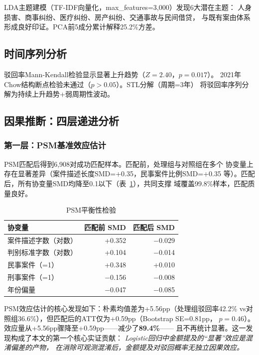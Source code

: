 \documentclass[12pt,a4paper,twoside]{ctexart}
\newcommand{\tabref}[1]{表~\ref{tab:#1}}
\begin{document}
LDA主题建模（TF-IDF向量化，max\_features=3,000）发现6大潜在主题：
人身损害、商事纠纷、医疗纠纷、房产纠纷、交通事故与民间借贷，
与既有案由体系形成良好印证。PCA前5成分累计解释25.2\%方差。

\subsection{时间序列分析}

驳回率Mann-Kendall检验显示显著上升趋势（$Z=2.40$，$p=0.017$）。
2021年Chow结构断点检验未通过（$p>0.05$）。STL分解（周期=3年）
将驳回率序列分解为持续上升趋势+弱周期性波动。

\subsection{因果推断：四层递进分析}

\subsubsection{第一层：PSM基准效应估计}

PSM匹配后得到6,908对成功匹配样本。匹配前，处理组与对照组在多个
协变量上存在显著差异（案件描述长度SMD=+0.35，民事案件比例SMD=+0.35
等）。匹配后，所有协变量SMD均降至0.1以下（\tabref{psm}），共同支撑
域覆盖99.8\%样本，匹配质量良好。

\begin{table}[H]\centering\caption{PSM平衡性检验}
\label{tab:psm}
\begin{tabular}{@{}lrr@{}}
\toprule
\textbf{协变量} & \textbf{匹配前 SMD} & \textbf{匹配后 SMD} \\
\midrule
案件描述字数（对数） & +0.352 & $-$0.029 \\
判别标准字数（对数） & +0.104 & $-$0.014 \\
民事案件（=1）      & +0.348 & +0.010 \\
刑事案件（=1）      & $-$0.156 & $-$0.008 \\
年份偏量            & $-$0.047 & $-$0.085 \\
\bottomrule
\end{tabular}
\end{table}

PSM效应估计的核心发现如下：朴素均值差为+5.56pp（处理组驳回率42.2\%
vs对照组36.6\%），但匹配后的ATT仅为+0.59pp（Bootstrap SE=0.81pp，
$p=0.46$）。效应量从+5.56pp骤降至+0.59pp——减少了\textbf{89.4\%}——
且不再统计显著。这一发现构成了本文的第一个核心实证贡献：
\textit{Logistic回归中金额提及的``显著''效应是混淆偏差的产物，
在消除可观测混淆后，金额提及对驳回概率无独立因果效应。}
\end{document}
